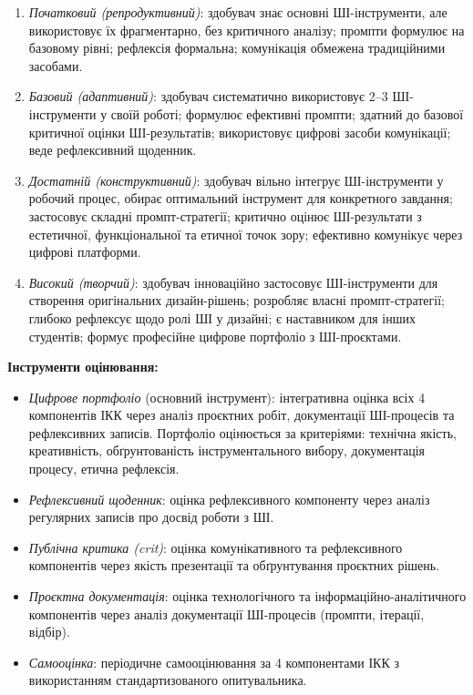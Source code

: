 \begin{enumerate}
    \item \textit{Початковий (репродуктивний)}: здобувач знає основні ШІ-інструменти, але використовує їх фрагментарно, без критичного аналізу; промпти формулює на базовому рівні; рефлексія формальна; комунікація обмежена традиційними засобами.

    \item \textit{Базовий (адаптивний)}: здобувач систематично використовує 2--3 ШІ-інструменти у своїй роботі; формулює ефективні промпти; здатний до базової критичної оцінки ШІ-результатів; використовує цифрові засоби комунікації; веде рефлексивний щоденник.

    \item \textit{Достатній (конструктивний)}: здобувач вільно інтегрує ШІ-інструменти у робочий процес, обирає оптимальний інструмент для конкретного завдання; застосовує складні промпт-стратегії; критично оцінює ШІ-результати з естетичної, функціональної та етичної точок зору; ефективно комунікує через цифрові платформи.

    \item \textit{Високий (творчий)}: здобувач інноваційно застосовує ШІ-інструменти для створення оригінальних дизайн-рішень; розробляє власні промпт-стратегії; глибоко рефлексує щодо ролі ШІ у дизайні; є наставником для інших студентів; формує професійне цифрове портфоліо з ШІ-проєктами.
\end{enumerate}

\textbf{Інструменти оцінювання:}
\begin{itemize}
    \item \textit{Цифрове портфоліо} (основний інструмент): інтегративна оцінка всіх 4 компонентів ІКК через аналіз проєктних робіт, документації ШІ-процесів та рефлексивних записів. Портфоліо оцінюється за критеріями: технічна якість, креативність, обґрунтованість інструментального вибору, документація процесу, етична рефлексія.
    \item \textit{Рефлексивний щоденник}: оцінка рефлексивного компоненту через аналіз регулярних записів про досвід роботи з ШІ.
    \item \textit{Публічна критика (crit)}: оцінка комунікативного та рефлексивного компонентів через якість презентації та обґрунтування проєктних рішень.
    \item \textit{Проєктна документація}: оцінка технологічного та інформаційно-аналітичного компонентів через аналіз документації ШІ-процесів (промпти, ітерації, відбір).
    \item \textit{Самооцінка}: періодичне самооцінювання за 4 компонентами ІКК з використанням стандартизованого опитувальника.
\end{itemize}

